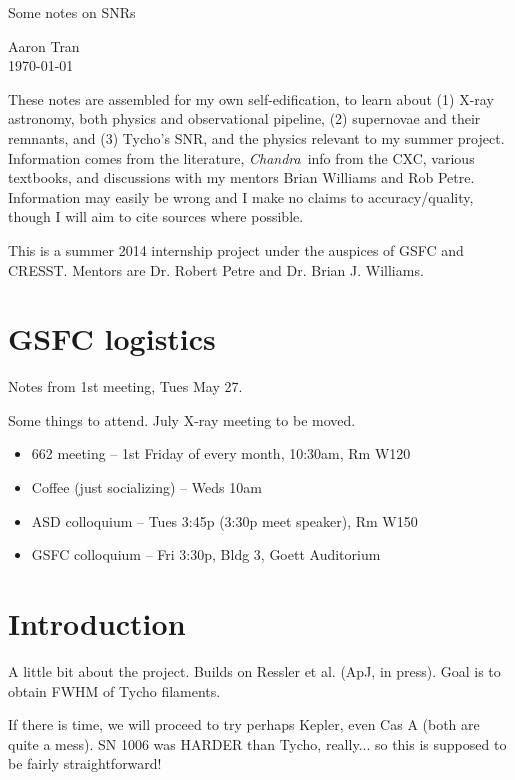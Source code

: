 \documentclass[10pt]{article}
\newcommand{\Chandra}{\textit{Chandra}}
\begin{document}
\begin{center}
    \Large{Some notes on SNRs}

    \normalsize
    Aaron Tran \\
    \today \\
\end{center}

These notes are assembled for my own self-edification, to learn about (1) X-ray
astronomy, both physics and observational pipeline, (2) supernovae and their
remnants, and (3) Tycho's SNR, and the physics relevant to my summer project.
Information comes from the literature, \Chandra\ info from the CXC, various
textbooks, and discussions with my mentors Brian Williams and Rob Petre.
Information may easily be wrong and I make no claims to accuracy/quality,
though I will aim to cite sources where possible.

This is a summer 2014 internship project under the auspices of GSFC and CRESST.
Mentors are Dr. Robert Petre and Dr. Brian J. Williams.

\section{GSFC logistics}

Notes from 1st meeting, Tues May 27.

Some things to attend.  July X-ray meeting to be moved.
\begin{itemize}
    \item 662 meeting -- 1st Friday of every month, 10:30am, Rm W120
    \item Coffee (just socializing) -- Weds 10am
    \item ASD colloquium -- Tues 3:45p (3:30p meet speaker), Rm W150
    \item GSFC colloquium -- Fri 3:30p, Bldg 3, Goett Auditorium
\end{itemize}

\section{Introduction}

A little bit about the project.  Builds on Ressler et al. (ApJ, in press).
Goal is to obtain FWHM of Tycho filaments.

If there is time, we will proceed to try perhaps Kepler, even Cas A (both are
quite a mess).  SN 1006 was HARDER than Tycho, really... so this is supposed to
be fairly straightforward!
\end{document}
